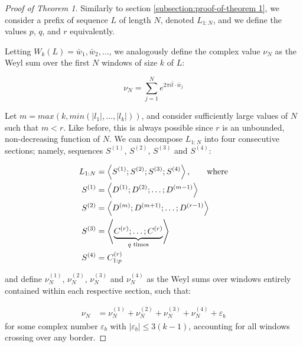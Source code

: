 \documentclass[11pt,a4paper]{tesis}
\theoremstyle{plain}
\theoremstyle{definition}
\begin{document}
\begin{proof}[Proof of Theorem 1]
  Similarly to section \ref{subsection:proof-of-theorem 1}, we consider a prefix of sequence $L$ of length $N$, denoted $L_{1:N}$, and we define the values $p$, $q$, and $r$ equivalently.

  Letting $W_k(L) = \bar{w}_1, \bar{w}_2, \dots$, we analogously define the complex value $\nu_N$ as the Weyl sum over the first $N$ windows of size $k$ of $L$:

  \begin{equation*}
    \nu_N = \sum_{j = 1}^{N} e^{2 \pi i \bar{l} \cdot \bar{w}_j}
  \end{equation*}

  Let $m = max\left(k, min\left(|l_1|, \dots, |l_k|\right)\right)$, and consider sufficiently large values of $N$ such that $m < r$. Like before, this is always possible since $r$ is an unbounded, non-decreasing function of $N$. We can decompose $L_{1:N}$ into four consecutive sections; namely, sequences $S^{(1)}$, $S^{(2)}$, $S^{(3)}$ and $S^{(4)}$:

  \begin{equation*}
    \begin{aligned}
      L_{1:N} & = \left< S^{(1)} ; S^{(2)} ; S^{(3)} ; S^{(4)} \right> \text{, \hspace*{5mm} where} \\
      S^{(1)} & = \left< D^{(1)} ; D^{(2)} ; \dots ; D^{(m - 1)} \right> \\
      S^{(2)} & = \left< D^{(m)} ; D^{(m + 1)} ; \dots ; D^{(r - 1)} \right> \\
      S^{(3)} & = \left< \underbrace{C^{(r)} ; \dots ; C^{(r)}}_{q \text{ times}} \right> \\ 
      S^{(4)} & = C^{(r)}_{1:p}
    \end{aligned}
  \end{equation*}

  and define $\nu_N^{(1)}$, $\nu_N^{(2)}$, $\nu_N^{(3)}$ and $\nu_N^{(4)}$ as the Weyl sums over windows entirely contained within each respective section, such that:

  \begin{equation*}
    \begin{aligned}
      \nu_N & = \nu^{(1)}_N + \nu^{(2)}_N + \nu^{(3)}_N + \nu^{(4)}_N + \varepsilon_b
    \end{aligned}
  \end{equation*}
  for some complex number $\varepsilon_b$ with $|\varepsilon_b| \le 3 (k - 1)$, accounting for all windows crossing over any border.


\end{proof}
\end{document}
